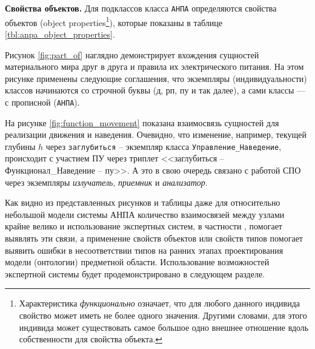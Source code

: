 \textbf{Свойства объектов.}
Для подклассов класса \texttt{АНПА} определяются свойства объектов (object properties\footnote{%
    Характеристика \textit{функционально} означает, что для любого данного индивида свойство может иметь не более одного значения.%
    Другими словами, для этого индивида может существовать самое большое одно внешнее отношение вдоль собственности для свойства объекта.%
}), которые показаны
в таблице \ref{tbl:anpa_object_properties}. 
%

Рисунок \ref{fig:part_of} наглядно демонстрирует вхождения сущностей материального мира друг в друга и правила их электрического питания.
На этом рисунке применены следующие соглашения, что экземпляры (индивидуальности) классов начинаются со строчной буквы (д, рп, пу и так далее),
а сами классы --- с прописной (\texttt{АНПА}).

На рисунке \ref{fig:function_movement} показана взаимосвязь сущностей для реализации движения и наведения.
Очевидно, что изменение, например, текущей глубины $h$ через \texttt{заглубиться} -- экземпляр класса \texttt{Управление\_Наведение},
происходит с участием ПУ через триплет <<заглубиться -- Функционал\_Наведение -- пу>>.
А это в свою очередь связано с работой СПО через экземпляры \textit{излучатель}, \textit{приемник} и \textit{анализатор}.

Как видно из представленных рисунков и таблицы даже для относительно небольшой модели системы АНПА количество взаимосвязей между узлами
крайне велико и использование экспертных систем, в частности \protege, помогает выявлять эти связи,
а применение свойств объектов или свойств типов помогает выявить ошибки в несоответствии типов на ранних этапах проектирования модели (онтологии)
предметной области. Использование возможностей экспертной системы будет продемонстрировано в следующем разделе.


